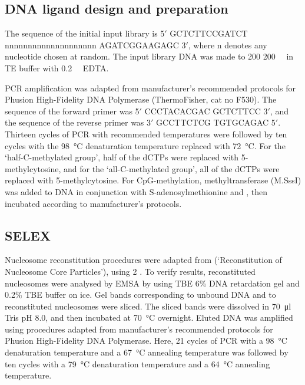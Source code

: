 \documentclass[parskip=full, numbers=noenddot]{scrreprt}
\begin{document}
\subsection{DNA ligand design and preparation}
\label{ssec:emsaselex_methods_lig}

The sequence of the initial input library is 5$'$ GCTCTTCCGATCT nnnnnnnnnnnnnnnnnnnn AGATCGGAAGAGC 3$'$, where n denotes any nucleotide chosen at random. The input library DNA was made to 200 \SI{200}{\nano\Molar} in TE buffer with \SI{0.2}{\milli\Molar} EDTA.

PCR amplification was adapted from manufacturer's recommended protocols for Phusion High-Fidelity DNA Polymerase (ThermoFisher, cat no F530).  The sequence of the forward primer was 5$'$ CCCTACACGAC GCTCTTCC 3$'$, and the sequence of the reverse primer was 3$'$ GCCTTCTCG TGTGCAGAC 5$'$.  Thirteen cycles of PCR with recommended temperatures were followed by ten cycles with the \SI{98}{\celsius} denaturation temperature replaced with \SI{72}{\celsius}.  For the `half-C-methylated group', half of the dCTPs were replaced with 5-methylcytosine, and for the `all-C-methylated group', all of the dCTPs were replaced with 5-methylcytosine.   For CpG-methylation, methyltransferase (M.SssI) was added to DNA in conjunction with S-adenosylmethionine and , then incubated according to manufacturer's protocols.

\subsection{SELEX}
\label{ssec:emsaselex_methods_selex}

Nucleosome reconstitution procedures were adapted from \citet{dyer_reconstitution_2003} (`Reconstitution of Nucleosome Core Particles'), using \SI{2}{\Molar} .  To verify results, reconstituted nucleosomes were analysed by EMSA by using TBE 6\% DNA retardation gel and 0.2\% TBE buffer on ice.  Gel bands corresponding to unbound DNA and to reconstituted nucleosomes were sliced.  The sliced bands were dissolved in \SI{70}{\micro\litre} Tris pH 8.0, and then incubated at \SI{70}{\celsius} overnight.  Eluted DNA was amplified using procedures adapted from manufacturer's recommended protocols for Phusion High-Fidelity DNA Polymerase.  Here, 21 cycles of PCR with a \SI{98}{\celsius} denaturation temperature and a \SI{67}{\celsius} annealing temperature was followed by ten cycles with a \SI{79}{\celsius} denaturation temperature and a \SI{64}{\celsius} annealing temperature.
\end{document}
